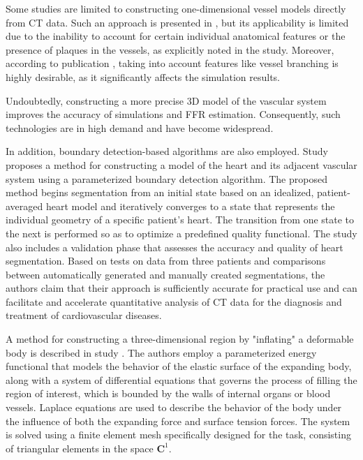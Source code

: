 \documentclass[default]{subfiles}
\begin{document}
Some studies are limited to constructing one-dimensional vessel models directly from CT data. Such an approach is
presented in \cite{carson2019benchmark}, but its applicability is limited due to the inability to account for certain
individual anatomical features or the presence of plaques in the vessels, as explicitly noted in the study. Moreover,
according to publication \cite{gamage2022octffr}, taking into account features like vessel branching is highly
desirable, as it significantly affects the simulation results.

Undoubtedly, constructing a more precise 3D model of the vascular system improves the accuracy of simulations and FFR
estimation. Consequently, such technologies are in high demand and have become widespread.

In addition, boundary detection-based algorithms are also employed. Study \cite{ecabert2011heart} proposes a method for
constructing a model of the heart and its adjacent vascular system using a parameterized boundary detection algorithm.
The proposed method begins segmentation from an initial state based on an idealized, patient-averaged heart model and
iteratively converges to a state that represents the individual geometry of a specific patient’s heart. The transition
from one state to the next is performed so as to optimize a predefined quality functional. The study also includes a
validation phase that assesses the accuracy and quality of heart segmentation. Based on tests on data from three
patients and comparisons between automatically generated and manually created segmentations, the authors claim that
their approach is sufficiently accurate for practical use and can facilitate and accelerate quantitative analysis of
CT data for the diagnosis and treatment of cardiovascular diseases.

A method for constructing a three-dimensional region by "inflating" a deformable body is described in study
\cite{mcinerney1995fem}. The authors employ a parameterized energy functional that models the behavior of the elastic
surface of the expanding body, along with a system of differential equations that governs the process of filling the
region of interest, which is bounded by the walls of internal organs or blood vessels. Laplace equations are used to
describe the behavior of the body under the influence of both the expanding force and surface tension forces. The
system is solved using a finite element mesh specifically designed for the task, consisting of triangular elements in
the space $\mathbf{C}^1$.
\end{document}

